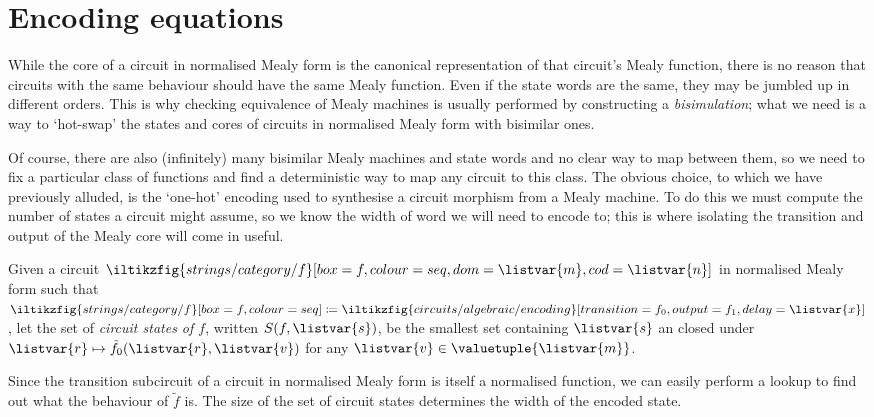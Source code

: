 \section{Encoding equations}

While the core of a circuit in normalised Mealy form is the canonical
representation of that circuit's Mealy function, there is no reason that
circuits with the same behaviour should have the same Mealy function.
Even if the state words are the same, they may be jumbled up in different
orders.
This is why checking equivalence of Mealy machines is usually performed by
constructing a \emph{bisimulation}; what we need is a way to `hot-swap' the
states and cores of circuits in normalised Mealy form with bisimilar ones.

Of course, there are also (infinitely) many bisimilar Mealy machines and state
words and no clear way to map between them, so we need to fix a particular
class of functions and find a deterministic way to map any circuit to this
class.
The obvious choice, to which we have previously alluded, is the `one-hot'
encoding used to synthesise a circuit morphism from a Mealy machine.
To do this we must compute the number of states a circuit might assume, so we
know the width of word we will need to encode to; this is where isolating the
transition and output of the Mealy core will come in useful.

\begin{definition}
    Given a circuit \(
        \iltikzfig{strings/category/f}[box=f,colour=seq,dom=\listvar{m},cod=\listvar{n}]
    \) in normalised Mealy form such that \(
        \iltikzfig{strings/category/f}[box=f,colour=seq]
        \coloneqq
        \iltikzfig{circuits/algebraic/encoding}[transition={f_0},output={f_1},delay=\listvar{x}]
    \), let the set of \emph{circuit states of \(f\)}, written
    \(S(f,\listvar{s})\), be the smallest set containing \(\listvar{s}\) an
    closed under \(
        \listvar{r} \mapsto \tilde{f}_0(\listvar{r},\listvar{v})
    \) for any \(\listvar{v} \in \valuetuple{\listvar{m}}\).
\end{definition}

Since the transition subcircuit of a circuit in normalised Mealy form is itself
a normalised function, we can easily perform a lookup to find out what the
behaviour of \(\tilde{f}\) is.
The size of the set of circuit states determines the width of the encoded state.


